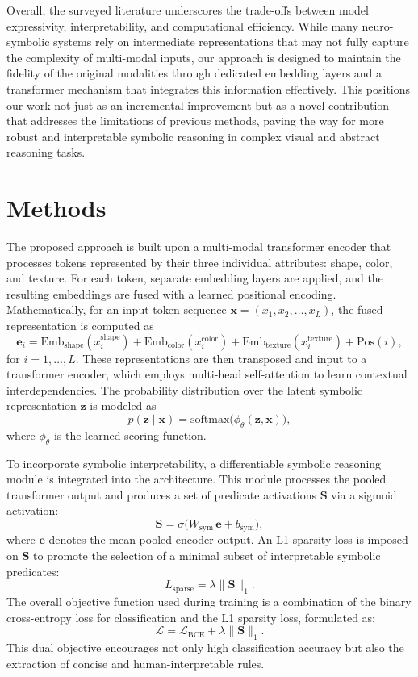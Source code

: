 \documentclass{article}
\begin{document}
Overall, the surveyed literature underscores the trade-offs between model expressivity, interpretability, and computational efficiency. While many neuro-symbolic systems rely on intermediate representations that may not fully capture the complexity of multi-modal inputs, our approach is designed to maintain the fidelity of the original modalities through dedicated embedding layers and a transformer mechanism that integrates this information effectively. This positions our work not just as an incremental improvement but as a novel contribution that addresses the limitations of previous methods, paving the way for more robust and interpretable symbolic reasoning in complex visual and abstract reasoning tasks.

\section{Methods}
The proposed approach is built upon a multi-modal transformer encoder that processes tokens represented by their three individual attributes: shape, color, and texture. For each token, separate embedding layers are applied, and the resulting embeddings are fused with a learned positional encoding. Mathematically, for an input token sequence \(\mathbf{x} = (x_1, x_2, \ldots, x_L)\), the fused representation is computed as 
\[
\mathbf{e}_i = \text{Emb}_{\text{shape}}(x^{\text{shape}}_i) + \text{Emb}_{\text{color}}(x^{\text{color}}_i) + \text{Emb}_{\text{texture}}(x^{\text{texture}}_i) + \text{Pos}(i),
\]
for \(i = 1, \ldots, L\). These representations are then transposed and input to a transformer encoder, which employs multi-head self-attention to learn contextual interdependencies. The probability distribution over the latent symbolic representation \(\mathbf{z}\) is modeled as 
\[
p(\mathbf{z} \mid \mathbf{x}) = \mathrm{softmax}\bigl(\phi_\theta(\mathbf{z},\mathbf{x})\bigr),
\]
where \(\phi_\theta\) is the learned scoring function.

To incorporate symbolic interpretability, a differentiable symbolic reasoning module is integrated into the architecture. This module processes the pooled transformer output and produces a set of predicate activations \(\mathbf{S}\) via a sigmoid activation:
\[
\mathbf{S} = \sigma\bigl(W_{\text{sym}}\, \bar{\mathbf{e}} + b_{\text{sym}}\bigr),
\]
where \(\bar{\mathbf{e}}\) denotes the mean-pooled encoder output. An L1 sparsity loss is imposed on \(\mathbf{S}\) to promote the selection of a minimal subset of interpretable symbolic predicates:
\[
L_{\text{sparse}} = \lambda \|\mathbf{S}\|_1.
\]
The overall objective function used during training is a combination of the binary cross-entropy loss for classification and the L1 sparsity loss, formulated as:
\[
\mathcal{L} = \mathcal{L}_{\mathrm{BCE}} + \lambda \|\mathbf{S}\|_1.
\]
This dual objective encourages not only high classification accuracy but also the extraction of concise and human-interpretable rules.
\end{document}
